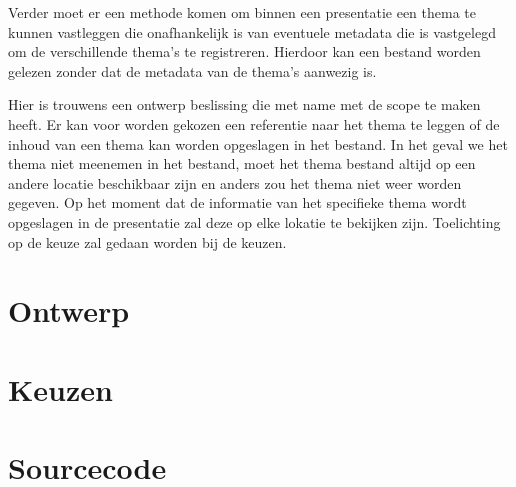 \documentclass[a4paper]{article}
\begin{document}
Verder moet er een methode komen om binnen een presentatie een thema te kunnen vastleggen die onafhankelijk is van eventuele metadata die is vastgelegd om de verschillende thema's te registreren. Hierdoor kan een bestand worden gelezen zonder dat de metadata van de thema's aanwezig is.

Hier is trouwens een ontwerp beslissing die met name met de scope te maken heeft. Er kan voor worden gekozen een referentie naar het thema te leggen of de inhoud van een thema kan worden opgeslagen in het bestand. In het geval we het thema niet meenemen in het bestand, moet het thema bestand altijd op een andere locatie beschikbaar zijn en anders zou het thema niet weer worden gegeven. Op het moment dat de informatie van het specifieke thema wordt opgeslagen in de presentatie zal deze op elke lokatie te bekijken zijn. Toelichting op de keuze zal gedaan worden bij de keuzen.

\section{Ontwerp}


\section{Keuzen}



\section{Sourcecode}
\end{document}
